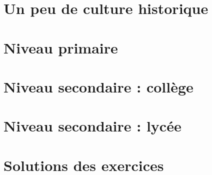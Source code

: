 \documentclass[12pt]{book}
\begin{document}
\mainmatter       %

\hypertarget{chap1}{}
\chapter{Un peu de culture historique}\label{chap1}



\hypertarget{chap:level1}{}
\chapter{Niveau primaire}\label{chap:level1}



\hypertarget{chap:level2}{}
\chapter{Niveau secondaire : collège}\label{chap:level2}



\hypertarget{chap:level3}{}
\chapter{Niveau secondaire : lycée}\label{chap:level3}






\hypertarget{chap:sol}{}
\chapter{Solutions des exercices}\label{chap:sol}

\newpage




\end{document}
